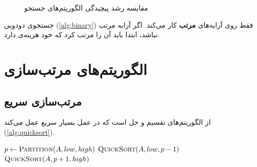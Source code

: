 \documentclass{matinbook}
\begin{document}
\begin{figure}[h]
\centering
\begin{latin}
\end{latin}
\caption{مقایسه رشد پیچیدگی الگوریتم‌های جستجو}
\label{fig:search-comparison}
\end{figure}

\begin{remark}
    جستجوی دودویی (\cref{alg:binary}) فقط روی
    آرایه‌های \textbf{مرتب} کار می‌کند. اگر آرایه
    مرتب نباشد، ابتدا باید آن را مرتب کرد که خود
    هزینه‌ی  دارد.
    \label{rem:binary-requirement}
\end{remark}

\chapter{الگوریتم‌های مرتب‌سازی}
\label{chap:sorting}

\section{مرتب‌سازی سریع}
\label{sec:sorting-quicksort}

 از
الگوریتم‌های تقسیم و حل است که
در عمل بسیار سریع عمل می‌کند (\cref{alg:quicksort}).

\begin{latin}
\begin{algorithm}
\caption{مرتب‌سازی سریع}
\label{alg:quicksort}
\begin{algorithmic}[1]
            \State $p \gets \Call{Partition}{A, low, high}$
            \State $\Call{QuickSort}{A, low, p-1}$
            \State $\Call{QuickSort}{A, p+1, high}$
        \EndIf
    \EndFunction
\end{algorithmic}
\end{algorithm}
\end{latin}
\end{document}
